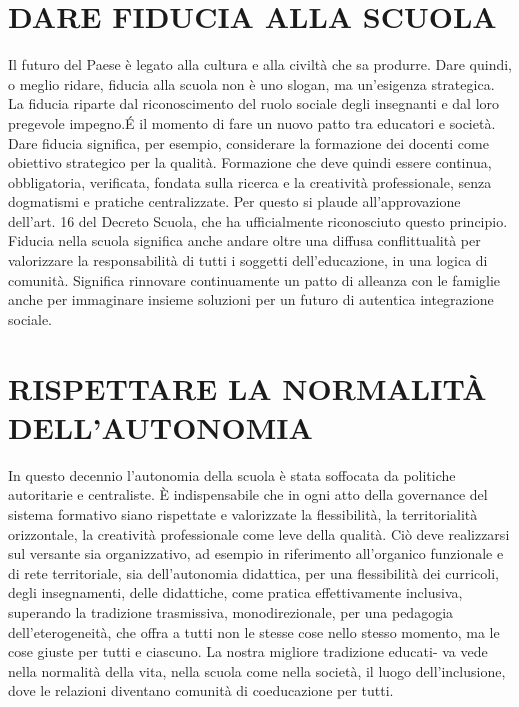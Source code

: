 \section*{DARE FIDUCIA ALLA SCUOLA}
Il futuro del Paese è legato alla cultura e alla civiltà che sa produrre. Dare quindi, o meglio ridare, fiducia alla scuola non è uno slogan, ma un'esigenza strategica. La fiducia
riparte dal riconoscimento del ruolo sociale degli insegnanti e dal loro pregevole impegno.\'{E} il momento di fare un nuovo patto tra educatori e società. Dare fiducia significa,
per esempio, considerare la formazione dei docenti come obiettivo strategico per la
qualità. Formazione che deve quindi essere continua, obbligatoria, verificata, fondata
sulla ricerca e la creatività professionale, senza dogmatismi e pratiche centralizzate. Per
questo si plaude all'approvazione dell'art. 16 del Decreto Scuola, che ha ufficialmente
riconosciuto questo principio. Fiducia nella scuola significa anche andare oltre una diffusa conflittualità per valorizzare la responsabilità di tutti i soggetti dell'educazione, in
una logica di comunità. Significa rinnovare continuamente un patto di alleanza con le
famiglie anche per immaginare insieme soluzioni per un futuro di autentica integrazione
sociale.
\section*{RISPETTARE LA NORMALITÀ DELL'AUTONOMIA}
In questo decennio l'autonomia della scuola è stata soffocata da politiche autoritarie
e centraliste. È indispensabile che in ogni atto della governance del sistema formativo
siano rispettate e valorizzate la flessibilità, la territorialità orizzontale, la creatività professionale come leve della qualità. Ciò deve realizzarsi sul versante sia organizzativo,
ad esempio in riferimento all'organico funzionale e di rete territoriale, sia dell'autonomia didattica, per una flessibilità dei curricoli, degli insegnamenti, delle didattiche, come
pratica effettivamente inclusiva, superando la tradizione trasmissiva, monodirezionale,
per una pedagogia dell'eterogeneità, che offra a tutti non le stesse cose nello stesso
momento, ma le cose giuste per tutti e ciascuno. La nostra migliore tradizione educati-
va vede nella normalità della vita, nella scuola come nella società, il luogo dell'inclusione, dove le relazioni diventano comunità di coeducazione per tutti.
